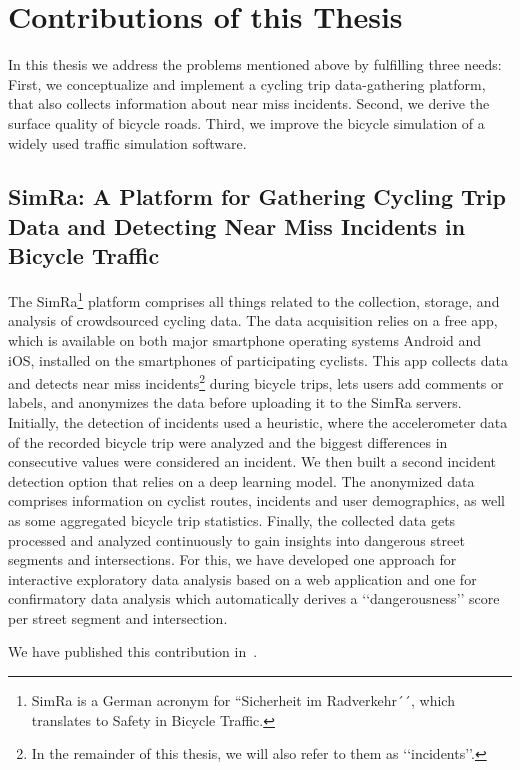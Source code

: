 \section{Contributions of this Thesis}
\label{sec:contributions}
In this thesis we address the problems mentioned above by fulfilling three needs:
First, we conceptualize and implement a cycling trip data-gathering platform, that also collects information about near miss incidents.
Second, we derive the surface quality of bicycle roads.
Third, we improve the bicycle simulation of a widely used traffic simulation software.

\subsection{SimRa: A Platform for Gathering Cycling Trip Data and Detecting Near Miss Incidents in Bicycle Traffic}
\label{subsec:simra_contribution}
The SimRa\footnote{SimRa is a German acronym for ``Sicherheit im Radverkehr´´, which translates to Safety in Bicycle Traffic.} platform comprises all things related to the collection, storage, and analysis of crowdsourced cycling data.
The data acquisition relies on a free app, which is available on both major smartphone operating systems Android and iOS, installed on the smartphones of participating cyclists.
This app collects data and detects near miss incidents\footnote{In the remainder of this thesis, we will also refer to them as ‘‘incidents’’.} during bicycle trips, lets users add comments or labels, and anonymizes the data before uploading it to the SimRa servers.
Initially, the detection of incidents used a heuristic, where the accelerometer data of the recorded bicycle trip were analyzed and the biggest differences in consecutive values were considered an incident.
We then built a second incident detection option that relies on a deep learning model.
The anonymized data comprises information on cyclist routes, incidents and user demographics, as well as some aggregated bicycle trip statistics.
Finally, the collected data gets processed and analyzed continuously to gain insights into dangerous street segments and intersections.
For this, we have developed one approach for interactive exploratory data analysis based on a web application and one for confirmatory data analysis which automatically derives a ‘‘dangerousness’’ score per street segment and intersection. 

We have published this contribution in~\cite{karakaya2020simra,karakaya2022cyclesense}.

